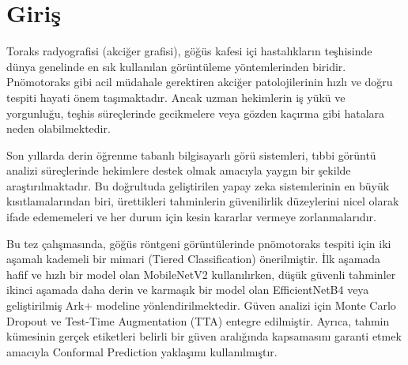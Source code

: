 \chapter{Giriş}
\label{ch:giris}

Toraks radyografisi (akciğer grafisi), göğüs kafesi içi hastalıkların teşhisinde dünya genelinde en sık kullanılan görüntüleme yöntemlerinden biridir. Pnömotoraks gibi acil müdahale gerektiren akciğer patolojilerinin hızlı ve doğru tespiti hayati önem taşımaktadır. Ancak uzman hekimlerin iş yükü ve yorgunluğu, teşhis süreçlerinde gecikmelere veya gözden kaçırma gibi hatalara neden olabilmektedir.

Son yıllarda derin öğrenme tabanlı bilgisayarlı görü sistemleri, tıbbi görüntü analizi süreçlerinde hekimlere destek olmak amacıyla yaygın bir şekilde araştırılmaktadır. Bu doğrultuda geliştirilen yapay zeka sistemlerinin en büyük kısıtlamalarından biri, ürettikleri tahminlerin güvenilirlik düzeylerini nicel olarak ifade edememeleri ve her durum için kesin kararlar vermeye zorlanmalarıdır.

Bu tez çalışmasında, göğüs röntgeni görüntülerinde pnömotoraks tespiti için iki aşamalı kademeli bir mimari (Tiered Classification) önerilmiştir. İlk aşamada hafif ve hızlı bir model olan MobileNetV2 \cite{sandler2018mobilenetv2} kullanılırken, düşük güvenli tahminler ikinci aşamada daha derin ve karmaşık bir model olan EfficientNetB4 \cite{tan2019efficientnet} veya geliştirilmiş Ark+ modeline yönlendirilmektedir. Güven analizi için Monte Carlo Dropout \cite{gal2016dropout} ve Test-Time Augmentation (TTA) entegre edilmiştir. Ayrıca, tahmin kümesinin gerçek etiketleri belirli bir güven aralığında kapsamasını garanti etmek amacıyla Conformal Prediction \cite{shafer2008tutorial} yaklaşımı kullanılmıştır.
